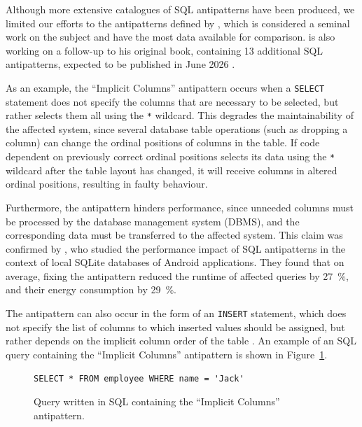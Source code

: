 Although more extensive catalogues of SQL antipatterns have been produced, we limited our efforts to the antipatterns defined by , which is considered a seminal work on the subject  and have the most data available for comparison.  is also working on a follow-up to his original book, containing \num{13} additional SQL antipatterns, expected to be published in June 2026 .

As an example, the “Implicit Columns” antipattern  occurs when a \texttt{SELECT} statement does not specify the columns that are necessary to be selected, but rather selects them all using the \texttt{*} wildcard. This degrades the maintainability of the affected system, since several database table operations (such as dropping a column) can change the ordinal positions of columns in the table. If code dependent on previously correct ordinal positions selects its data using the \texttt{*} wildcard after the table layout has changed, it will receive columns in altered ordinal positions, resulting in faulty behaviour.

Furthermore, the antipattern hinders performance, since unneeded columns must be processed by the database management system (DBMS), and the corresponding data must be transferred to the affected system. This claim was confirmed by , who studied the performance impact of SQL antipatterns in the context of local SQLite databases of Android applications. They found that on average, fixing the antipattern reduced the runtime of affected queries by \qty{27}{\percent}, and their energy consumption by \qty{29}{\percent}.

The antipattern can also occur in the form of an \texttt{INSERT} statement, which does not specify the list of columns to which inserted values should be assigned, but rather depends on the implicit column order of the table . An example of an SQL query containing the “Implicit Columns” antipattern is shown in Figure~\ref{fig:implicitColumnsSql}.

\begin{figure}[h]
    \begin{lstlisting}[frame=none, basicstyle=\small]
SELECT * FROM employee WHERE name = 'Jack'
    \end{lstlisting}
    \caption{Query written in SQL containing the “Implicit Columns” antipattern.}
    \label{fig:implicitColumnsSql}
\end{figure}

